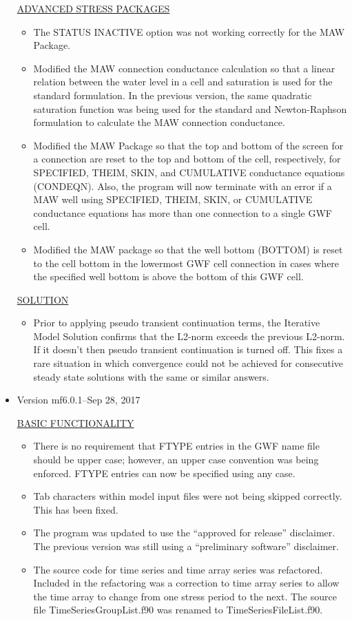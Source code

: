 \begin{itemize}
	\underline{ADVANCED STRESS PACKAGES}
	\begin{itemize}
		\item The STATUS INACTIVE option was not working correctly for the MAW Package.
		\item Modified the MAW connection conductance calculation so that a linear relation between the water level in a cell and saturation is used for the standard formulation. In the previous version, the same quadratic saturation function was being used for the standard and Newton-Raphson formulation to calculate the MAW connection conductance. 
		\item Modified the MAW Package so that the top and bottom of the screen for a connection are reset to the top and bottom of the cell, respectively, for SPECIFIED, THEIM, SKIN, and CUMULATIVE conductance equations (CONDEQN). Also, the program will now terminate with an error if a MAW well using SPECIFIED, THEIM, SKIN, or CUMULATIVE conductance equations has more than one connection to a single GWF cell. 
		\item Modified the MAW package so that the well bottom (BOTTOM) is reset to the cell bottom in the lowermost GWF cell connection in cases where the specified well bottom is above the bottom of this GWF cell.
	\end{itemize}
	
	\underline{SOLUTION}
	\begin{itemize}
		\item Prior to applying pseudo transient continuation terms, the Iterative Model Solution confirms that the L2-norm exceeds the previous L2-norm.  If it doesn't then pseudo transient continuation is turned off.  This fixes a rare situation in which convergence could not be achieved for consecutive steady state solutions with the same or similar answers. 
	\end{itemize}
	
	
	\item Version mf6.0.1--Sep 28, 2017
	
	\underline{BASIC FUNCTIONALITY}
	\begin{itemize}
		\item There is no requirement that FTYPE entries in the GWF name file should be upper case; however, an upper case convention was being enforced.  FTYPE entries can now be specified using any case.
		\item Tab characters within model input files were not being skipped correctly.  This has been fixed.
		\item The program was updated to use the ``approved for release'' disclaimer.  The previous version was still using a ``preliminary software'' disclaimer.
		\item The source code for time series and time array series was refactored.  Included in the refactoring was a correction to time array series to allow the time array to change from one stress period to the next.  The source file TimeSeriesGroupList.f90 was renamed to TimeSeriesFileList.f90.
	\end{itemize}
	

\end{itemize}
